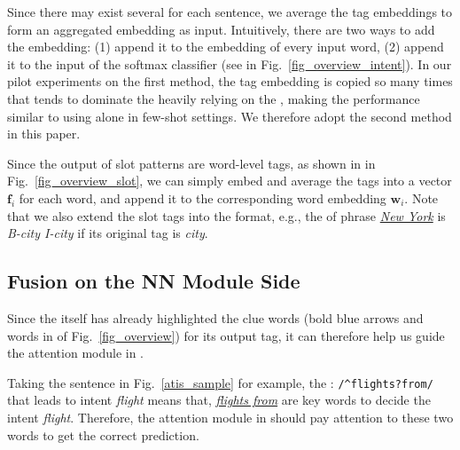 Since there may exist several \REtags for each sentence, we average the tag embeddings to form an aggregated embedding as input.
Intuitively, there are two ways to add the embedding: (1) append it to the embedding of every input word, (2) append it to the input of the softmax classifier (see  in Fig.~\ref{fig_overview_intent}).
In our pilot experiments on the first method, the tag embedding is copied so many times that tends to dominate the \NN heavily relying on the \REtags, making the performance similar to using \RE alone in few-shot settings. We therefore adopt the second method in this paper.

Since the output of slot \RE patterns are word-level tags, as shown in  in Fig.~\ref{fig_overview_slot}, we can simply embed
and average the \RE tags into a vector $\textbf{f}_i$ for each word, and append it to the corresponding word embedding $\textbf{w}_i$.
Note that we also extend the slot \RE tags into the \BIO format, e.g.,  
the \REtag of phrase \textsl{\underline{New York}} is \emph{B-city I-city} if its original tag is \emph{city}.

\subsection{Fusion on the NN Module Side}
\label{interact_with_module}
Since the \RE itself has already highlighted the clue words (bold blue arrows and words in  of Fig.~\ref{fig_overview}) for its output tag, it can therefore help us guide the attention module in \NN.

Taking the sentence in Fig.~\ref{atis_sample} for example, the {\small \RE: \texttt{/\textasciicircum flights?\:from/} } that leads to intent \emph{flight} means that, \textsl{\underline{flights from}} are key words to decide the intent \emph{flight}. Therefore, the attention module in \NN should pay attention to these two words to get the correct prediction.

